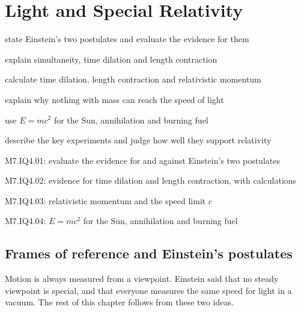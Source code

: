 \chapter{Light and Special Relativity}\label{ch4:chap}


\begin{goals}
  \item state Einstein's two postulates and evaluate the evidence for them
  \item explain simultaneity, time dilation and length contraction
  \item calculate time dilation, length contraction and relativistic momentum
  \item explain why nothing with mass can reach the speed of light
  \item use $E = mc^2$ for the Sun, annihilation and burning fuel
  \item describe the key experiments and judge how well they support relativity
\end{goals}

\begin{syllabus}
  \item M7.IQ4.01: evaluate the evidence for and against Einstein's two postulates
  \item M7.IQ4.02: evidence for time dilation and length contraction, with calculations
  \item M7.IQ4.03: relativistic momentum and the speed limit $c$
  \item M7.IQ4.04: $E = mc^2$ for the Sun, annihilation and burning fuel
\end{syllabus}

\section{Frames of reference and Einstein's postulates}\label{ch4:sec:postulates}

\begin{bigidea}
Motion is always measured from a viewpoint. Einstein said that no steady viewpoint is special,
and that everyone measures the same speed for light in a vacuum. The rest of this chapter
follows from these two ideas.
\end{bigidea}

